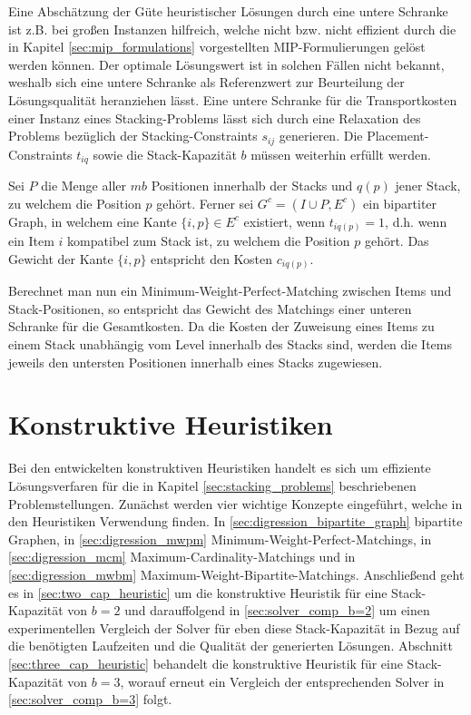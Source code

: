 Eine Abschätzung der Güte heuristischer Lösungen durch eine untere Schranke ist z.B. bei großen Instanzen hilfreich,
welche nicht bzw. nicht effizient durch die in Kapitel \ref{sec:mip_formulations} vorgestellten MIP-Formulierungen gelöst werden können.
Der optimale Lösungswert ist in solchen Fällen nicht bekannt, weshalb sich eine untere Schranke als Referenzwert
zur Beurteilung der Lösungsqualität heranziehen lässt. Eine untere Schranke für die Transportkosten einer Instanz eines Stacking-Problems lässt sich durch eine Relaxation des Problems bezüglich der Stacking-Constraints $s_{ij}$ generieren.
Die Placement-Constraints $t_{iq}$ sowie die Stack-Kapazität $b$ müssen weiterhin erfüllt werden.

Sei $P$ die Menge aller $mb$ Positionen innerhalb der Stacks und $q(p)$ jener Stack, zu welchem die Position $p$ gehört.
Ferner sei $G^c = (I \cup P, E^c)$ ein bipartiter Graph, in welchem eine Kante $\{i, p\} \in E^c$ existiert,
wenn $t_{iq(p)} = 1$, d.h. wenn ein Item $i$ kompatibel zum Stack ist, zu welchem die Position $p$ gehört.
Das Gewicht der Kante $\{i, p\}$ entspricht den Kosten $c_{iq(p)}$.

Berechnet man nun ein Minimum-Weight-Perfect-Matching zwischen Items und Stack-Positionen, so entspricht
das Gewicht des Matchings einer unteren Schranke für die Gesamtkosten. Da die Kosten der Zuweisung eines Items
zu einem Stack unabhängig vom Level innerhalb des Stacks sind, werden die Items jeweils den untersten Positionen
innerhalb eines Stacks zugewiesen.

\vfill

\pagebreak

\section{Konstruktive Heuristiken}
\label{sec:constructive_heuristics}

Bei den entwickelten konstruktiven Heuristiken handelt es sich um effiziente Lösungsverfaren für die in Kapitel \ref{sec:stacking_problems}
beschriebenen Problemstellungen. Zunächst werden vier wichtige Konzepte eingeführt, welche in den Heuristiken Verwendung finden.
In \ref{sec:digression_bipartite_graph} bipartite Graphen, in \ref{sec:digression_mwpm} Minimum-Weight-Perfect-Matchings, in \ref{sec:digression_mcm} Maximum-Cardinality-Matchings und in \ref{sec:digression_mwbm} Maximum-Weight-Bipartite-Matchings. Anschließend geht es in \ref{sec:two_cap_heuristic} um die konstruktive Heuristik
für eine Stack-Kapazität von $b=2$ und darauffolgend in \ref{sec:solver_comp_b=2} um einen experimentellen Vergleich der Solver für
eben diese Stack-Kapazität in Bezug auf die benötigten Laufzeiten und die Qualität der generierten Lösungen.
Abschnitt \ref{sec:three_cap_heuristic} behandelt die konstruktive Heuristik für eine Stack-Kapazität von $b=3$, worauf erneut ein Vergleich der entsprechenden Solver in \ref{sec:solver_comp_b=3} folgt.

